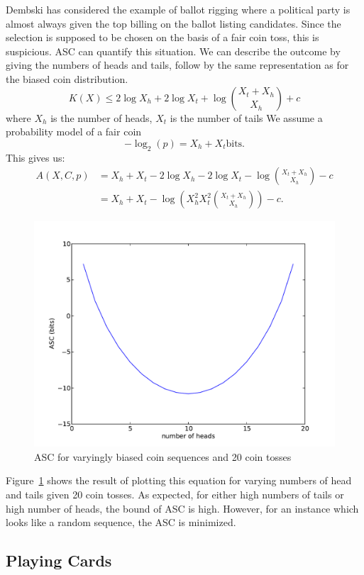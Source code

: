 Dembski \citep{Dembski1998} has considered the example of ballot rigging where a political party is almost always given the top billing on the ballot listing candidates.
Since the selection is supposed to be chosen on the basis of a fair coin toss, this is suspicious.
ASC can quantify this situation.
We can describe the outcome by giving the numbers of heads and tails, follow by the same representation as for the biased coin distribution.
\begin{equation}
    K(X) \leq 2 \log X_h + 2 \log X_t + \log {X_t + X_h \choose X_h} + c
\end{equation} where $X_h$ is the number of heads, $X_t$ is the number of tails
We assume a probability model of a fair coin
\begin{equation}
    -\log_2(p) = X_h + X_t \mbox{bits.}
\end{equation}
This gives us:
\begin{align}
    A(X,C,p) &= X_h + X_t - 2 \log X_h -  2 \log X_t - \log {X_t + X_h \choose X_h} - c \nonumber \\
    &= X_h + X_t - \log \left( X_h^2 X_t^2 {X_t + X_h \choose X_h} \right) - c \mbox{.}
\end{align}
\begin{figure}
    \begin{center}
        \includegraphics[width=.5\textwidth]{EwertCoin}
    \end{center}
    \caption{ASC for varyingly biased coin sequences and 20 coin tosses}
    \label{fig_coins}
\end{figure}
Figure~\ref{fig_coins} shows the result of plotting this equation for varying numbers of head and tails given 20 coin tosses.
As expected, for either high numbers of tails or high number of heads, the bound of ASC is high.
However, for an instance which looks like a random sequence, the ASC is minimized.


\subsection{Playing Cards}

